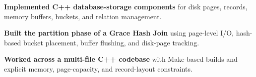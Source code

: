 \begin{bullets}
    \item \textbf{Implemented C++ database-storage components} for disk pages, records, memory buffers, buckets, and relation management.
    \item \textbf{Built the partition phase of a Grace Hash Join} using page-level I/O, hash-based bucket placement, buffer flushing, and disk-page tracking.
    \item \textbf{Worked across a multi-file C++ codebase} with Make-based builds and explicit memory, page-capacity, and record-layout constraints.
\end{bullets}